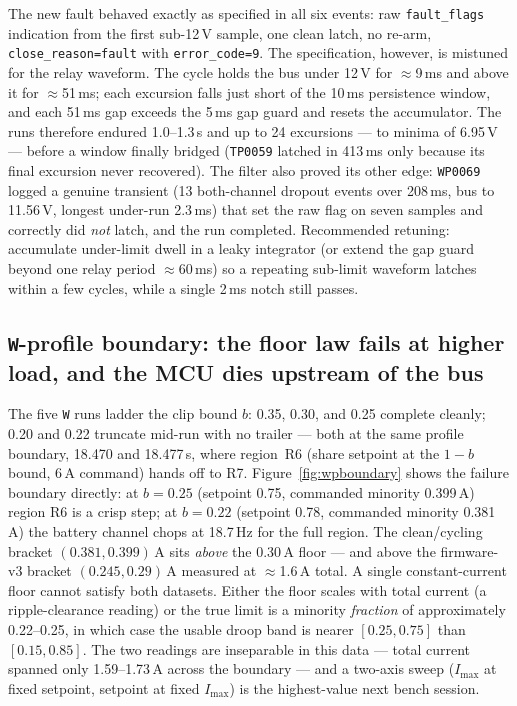 \documentclass[11pt]{article}
\newcommand{\code}[1]{\texttt{#1}}
\begin{document}
The new fault behaved exactly as specified in all six events: raw
\code{fault\_flags} indication from the first sub-12\,V sample, one clean latch,
no re-arm, \code{close\_reason=fault} with \code{error\_code=9}. The
specification, however, is mistuned for the relay waveform. The cycle holds the
bus under 12\,V for $\approx$9\,ms and above it for $\approx$51\,ms; each
excursion falls just short of the 10\,ms persistence window, and each 51\,ms gap
exceeds the 5\,ms gap guard and resets the accumulator. The runs therefore
endured 1.0--1.3\,s and up to 24 excursions --- to minima of 6.95\,V --- before a
window finally bridged (\code{TP0059} latched in 413\,ms only because its final
excursion never recovered). The filter also proved its other edge:
\code{WP0069} logged a genuine transient (13 both-channel dropout events over
208\,ms, bus to 11.56\,V, longest under-run 2.3\,ms) that set the raw flag on
seven samples and correctly did \emph{not} latch, and the run completed.
Recommended retuning: accumulate under-limit dwell in a leaky integrator (or
extend the gap guard beyond one relay period $\approx$60\,ms) so a repeating
sub-limit waveform latches within a few cycles, while a single 2\,ms notch still
passes.

\subsection{\code{W}-profile boundary: the floor law fails at higher load, and
the MCU dies upstream of the bus}
\label{sec:wpv4}

The five \code{W} runs ladder the clip bound $b$: 0.35, 0.30, and 0.25 complete
cleanly; 0.20 and 0.22 truncate mid-run with no trailer --- both at the same
profile boundary, 18.470 and 18.477\,s, where region~R6 (share setpoint at the
$1-b$ bound, 6\,A command) hands off to R7. Figure~\ref{fig:wpboundary} shows
the failure boundary directly: at $b=0.25$ (setpoint 0.75, commanded minority
0.399\,A) region R6 is a crisp step; at $b=0.22$ (setpoint 0.78, commanded
minority 0.381\,A) the battery channel chops at 18.7\,Hz for the full region.
The clean/cycling bracket $(0.381, 0.399)$\,A sits \emph{above} the 0.30\,A
floor --- and above the firmware-v3 bracket $(0.245, 0.29)$\,A measured at
$\approx$1.6\,A total. A single constant-current floor cannot satisfy both
datasets. Either the floor scales with total current (a ripple-clearance
reading) or the true limit is a minority \emph{fraction} of approximately
0.22--0.25, in which case the usable droop band is nearer $[0.25, 0.75]$ than
$[0.15, 0.85]$. The two readings are inseparable in this data --- total current
spanned only 1.59--1.73\,A across the boundary --- and a two-axis sweep
($I_\mathrm{max}$ at fixed setpoint, setpoint at fixed $I_\mathrm{max}$) is the
highest-value next bench session.
\end{document}
